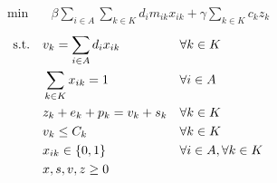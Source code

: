 \begin{align}
    \min\quad       & \beta \sum_{i \in A} \sum_{k \in K}{d_{i} m_{ik} x_{ik}} + \gamma \sum_{k \in K}{c_k z_k}
    \label{eq:migr0-obj}
\end{align}
\vspace*{-6mm}
\begin{align}
    \text{s.t.\quad}
    \label{eq:migr0-c1}
    & v_k = \sum_{i \in A}{d_i x_{ik}}              &   & \forall k \in K                  \\
    \label{eq:migr0-c2}
    & \sum_{k \in K}{x_{ik}} = 1                    &   & \forall i \in A                  \\
    \label{eq:migr0-c3}
    & z_k + e_k + p_k = v_k + s_k                   &   & \forall k \in K                  \\
    \label{eq:migr0-c4}
    & v_k \leq C_k                                  &   & \forall k \in K                  \\
    \label{eq:migr0-c5}
    & x_{ik} \in \{0,1\}                            &   & \forall i \in A, \forall k \in K \\
    \label{eq:migr0-c6}
    & x, s, v, z \geq 0                          &   &
\end{align}
